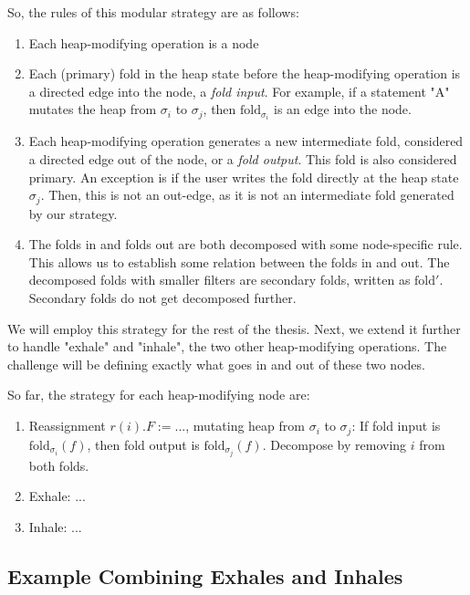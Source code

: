 \documentclass[msc,oneside]{ubcthesis}
\begin{document}
So, the rules of this modular strategy are as follows:
\begin{enumerate}
    \item Each heap-modifying operation is a node
    \item Each (primary) fold in the heap state before the heap-modifying operation is a directed edge into the node, a  \emph{fold input}. For example, if a statement "A" mutates the heap from $\sigma_i$ to $\sigma_j$, then $\textrm{fold}_{\sigma_i}$ is an edge into the node.
    \item Each heap-modifying operation generates a new intermediate fold, considered a directed edge out of the node, or a \emph{fold output}. This fold is also considered primary. An exception is if the user writes the fold directly at the heap state $\sigma_j$. Then, this is not an out-edge, as it is not an intermediate fold generated by our strategy.
    \item The folds in and folds out are both decomposed with some node-specific rule. This allows us to establish some relation between the folds in and out. The decomposed folds with smaller filters are secondary folds, written as $\textrm{fold}'$. Secondary folds do not get decomposed further.
\end{enumerate}

We will employ this strategy for the rest of the thesis. Next, we extend it further to handle "exhale" and "inhale", the two other heap-modifying operations. The challenge will be defining exactly what goes in and out of these two nodes.

So far, the strategy for each heap-modifying node are:
\begin{enumerate}
    \item Reassignment $r(i).F := ...$, mutating heap from $\sigma_i$ to $\sigma_j$: 
    If fold input is $\textrm{fold}_{\sigma_i}(f)$, then fold output is $\textrm{fold}_{\sigma_j}(f)$. 
    Decompose by removing $i$ from both folds.
    \item Exhale: ...
    \item Inhale: ...
\end{enumerate}

\subsection{Example Combining Exhales and Inhales}
\end{document}
